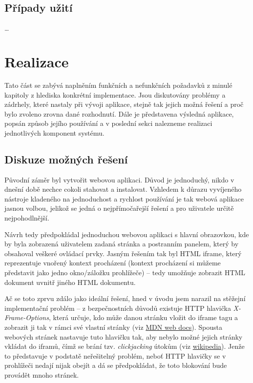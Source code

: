 \documentclass[thesis=B,czech]{FITthesis}[2012/06/26]
\begin{document}

\section{Případy užití}
\dots



\chapter{Realizace}
Tato část se zabývá naplněním funkčních a nefunkčních požadavků z minulé kapitoly z hlediska konkrétní implementace. Jsou diskutovány problémy a zádrhely, které nastaly při vývoji aplikace, stejně tak jejich možná řešení a proč bylo zvoleno zrovna dané rozhodnutí. Dále je představena výsledná aplikace, popsán způsob jejího používání a v poslední sekci nalezneme realizaci jednotlivých komponent systému.


\section{Diskuze možných řešení}
Původní záměr byl vytvořit webovou aplikaci. Důvod je jednoduchý, nikdo v dnešní době nechce cokoli stahovat a instalovat. Vzhledem k důrazu vyvíjeného nástroje kladeného na jednoduchost a rychlost používání je tak webová aplikace jasnou volbou, jelikož se jedná o nejpřímočařejší řešení a pro uživatele určitě nejpohodlnější.

Návrh tedy předpokládal jednoduchou webovou aplikaci s hlavní obrazovkou, kde by byla zobrazená uživatelem zadaná stránka a postranním panelem, který by obsahoval veškeré ovládací prvky. Jasným řešením tak byl HTML iframe, který reprezentuje vnořený kontext procházení (kontext procházení si můžeme představit jako jedno okno/záložku prohlížeče) -- tedy umožňuje zobrazit HTML dokument uvnitř jiného HTML dokumentu.

Ač se toto zprvu zdálo jako ideální řešení, hned v úvodu jsem narazil na stěžejní implementační problém -- z bezpečnostních důvodů existuje HTTP hlavička \emph{X-Frame-Options}, která určuje, kdo může danou stránku vložit do iframe tagu a zobrazit ji tak v rámci své vlastní stránky (viz \href{https://developer.mozilla.org/en-US/docs/Web/HTTP/Headers/X-Frame-Options}{MDN web docs}). Spousta webových stránek nastavuje tuto hlavičku tak, aby nebylo možné jejich stránky vkládat do iframů, čímž se brání tzv. \emph{clickjacking} útokům (viz \href{https://en.wikipedia.org/wiki/Clickjacking}{wikipedia}). Jenže to představuje v podstatě neřešitelný problém, neboť HTTP hlavičky se v prohlížeči nedají nijak obejít a dá se předpokládat, že toto blokování bude provádět mnoho stránek.
\end{document}

